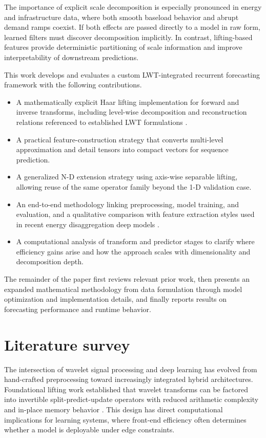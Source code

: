 \documentclass[journal]{IEEEtran}
\begin{document}
The importance of explicit scale decomposition is especially pronounced in energy and infrastructure data, where both smooth baseload behavior and abrupt demand ramps coexist. If both effects are passed directly to a model in raw form, learned filters must discover decomposition implicitly. In contrast, lifting-based features provide deterministic partitioning of scale information and improve interpretability of downstream predictions.

This work develops and evaluates a custom LWT-integrated recurrent forecasting framework with the following contributions.
\begin{itemize}
    \item A mathematically explicit Haar lifting implementation for forward and inverse transforms, including level-wise decomposition and reconstruction relations referenced to established LWT formulations \cite{matlabLwtDoc,uytterhoeven1997lifting}.
    \item A practical feature-construction strategy that converts multi-level approximation and detail tensors into compact vectors for sequence prediction.
    \item A generalized N-D extension strategy using axis-wise separable lifting, allowing reuse of the same operator family beyond the 1-D validation case.
    \item An end-to-end methodology linking preprocessing, model training, and evaluation, and a qualitative comparison with feature extraction styles used in recent energy disaggregation deep models \cite{ylla2024nilm,yllaRepo}.
  \item A computational analysis of transform and predictor stages to clarify where efficiency gains arise and how the approach scales with dimensionality and decomposition depth.
\end{itemize}

The remainder of the paper first reviews relevant prior work, then presents an expanded mathematical methodology from data formulation through model optimization and implementation details, and finally reports results on forecasting performance and runtime behavior.

\section{Literature survey}
The intersection of wavelet signal processing and deep learning has evolved from hand-crafted preprocessing toward increasingly integrated hybrid architectures. Foundational lifting work established that wavelet transforms can be factored into invertible split-predict-update operators with reduced arithmetic complexity and in-place memory behavior \cite{uytterhoeven1997lifting}. This design has direct computational implications for learning systems, where front-end efficiency often determines whether a model is deployable under edge constraints.
\end{document}
